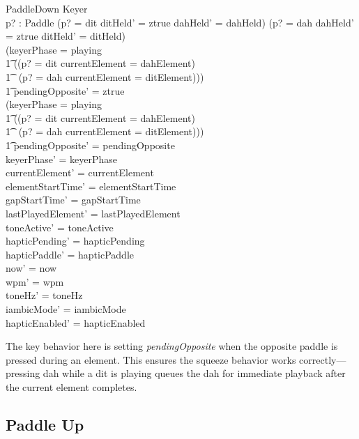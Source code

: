 \documentclass[a4paper,10pt,fleqn]{article}
\begin{document}
\begin{schema}{PaddleDown}
\Delta Keyer \\
p? : Paddle
\where
(p? = dit \land ditHeld' = ztrue \land dahHeld' = dahHeld) \lor
(p? = dah \land dahHeld' = ztrue \land ditHeld' = ditHeld) \\
(keyerPhase = playing \land \\
\t1 ((p? = dit \land currentElement = dahElement) \lor \\
\t1 ~(p? = dah \land currentElement = ditElement))) \\
\t1 \implies pendingOpposite' = ztrue \\
\lnot (keyerPhase = playing \land \\
\t1 ((p? = dit \land currentElement = dahElement) \lor \\
\t1 ~(p? = dah \land currentElement = ditElement))) \\
\t1 \implies pendingOpposite' = pendingOpposite \\
keyerPhase' = keyerPhase \\
currentElement' = currentElement \\
elementStartTime' = elementStartTime \\
gapStartTime' = gapStartTime \\
lastPlayedElement' = lastPlayedElement \\
toneActive' = toneActive \\
hapticPending' = hapticPending \\
hapticPaddle' = hapticPaddle \\
now' = now \\
wpm' = wpm \\
toneHz' = toneHz \\
iambicMode' = iambicMode \\
hapticEnabled' = hapticEnabled
\end{schema}

The key behavior here is setting \emph{pendingOpposite} when the opposite
paddle is pressed during an element. This ensures the squeeze behavior
works correctly---pressing dah while a dit is playing queues the dah for
immediate playback after the current element completes.

\subsection{Paddle Up}
\end{document}
